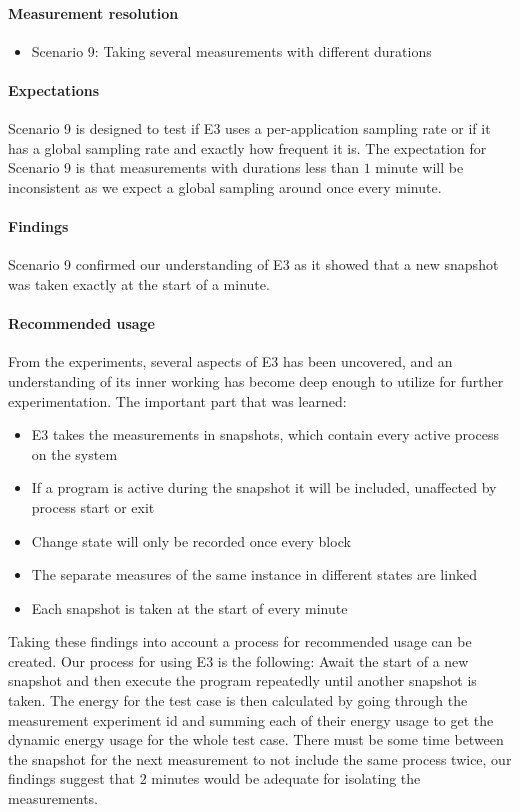 \paragraph{Measurement resolution}

\begin{itemize}
    \item Scenario 9: Taking several measurements with different durations
\end{itemize}

\paragraph{Expectations}
Scenario 9 is designed to test if E3 uses a per-application sampling rate or if it has a global sampling rate and exactly how frequent it is. The expectation for Scenario 9 is that measurements with durations less than $1$ minute will be inconsistent as we expect a global sampling around once every minute.

\paragraph{Findings}
Scenario 9 confirmed our understanding of E3 as it showed that a new snapshot was taken exactly at the start of a minute.

\paragraph {Recommended usage}
From the experiments, several aspects of E3 has been uncovered, and an understanding of its inner working has become deep enough to utilize for further experimentation. The important part that was learned:


\begin{itemize}
    \item E3 takes the measurements in snapshots, which contain every active process on the system
    \item If a program is active during the snapshot it will be included, unaffected by process start or exit
    \item Change state will only be recorded once every block
    \item The separate measures of the same instance in different states are linked
    \item Each snapshot is taken at the start of every minute
\end{itemize} 

Taking these findings into account a process for recommended usage can be created. Our process for using E3 is the following: Await the start of a new snapshot and then execute the program repeatedly until another snapshot is taken. The energy for the test case is then calculated by going through the measurement experiment id and summing each of their energy usage to get the dynamic energy usage for the whole test case. There must be some time between the snapshot for the next measurement to not include the same process twice, our findings suggest that $2$ minutes would be adequate for isolating the measurements.    